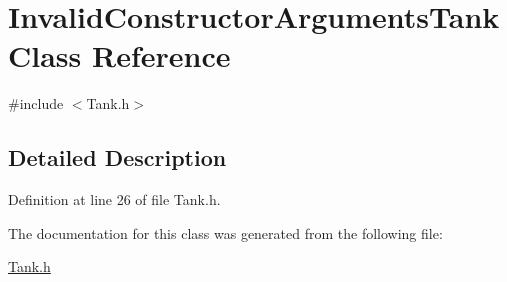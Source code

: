 \hypertarget{classInvalidConstructorArgumentsTank}{\section{Invalid\-Constructor\-Arguments\-Tank Class Reference}
\label{classInvalidConstructorArgumentsTank}
}


{\ttfamily \#include $<$Tank.\-h$>$}



\subsection{Detailed Description}


Definition at line 26 of file Tank.\-h.



The documentation for this class was generated from the following file\-:\begin{DoxyCompactItemize}
\item 
\hyperlink{Tank_8h}{Tank.\-h}\end{DoxyCompactItemize}
